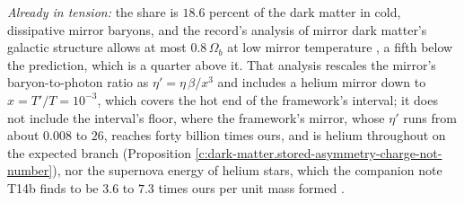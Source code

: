 \documentclass[11pt]{article}
\theoremstyle{definition}
\theoremstyle{plain}
\begin{document}
\begin{enumerate}
\emph{Already in tension:} the share is $18.6$ percent of the dark matter in cold, dissipative mirror baryons, and the record's analysis of mirror dark matter's galactic structure allows at most $0.8\,\Omega_{b}$ at low mirror temperature \cite{RouxCline2020}, a fifth below the prediction, which is a quarter above it. That analysis rescales the mirror's baryon-to-photon ratio as $\eta' = \eta\,\beta/x^{3}$ and includes a helium mirror down to $x = T'/T = 10^{-3}$, which covers the hot end of the framework's interval; it does not include the interval's floor, where the framework's mirror, whose $\eta'$ runs from about $0.008$ to $26$, reaches forty billion times ours, and is helium throughout on the expected branch (Proposition \ref{c:dark-matter.stored-asymmetry-charge-not-number}), nor the supernova energy of helium stars, which the companion note T14b finds to be $3.6$ to $7.3$ times ours per unit mass formed \cite{ButlerT14b}.


\end{enumerate}
\end{document}
